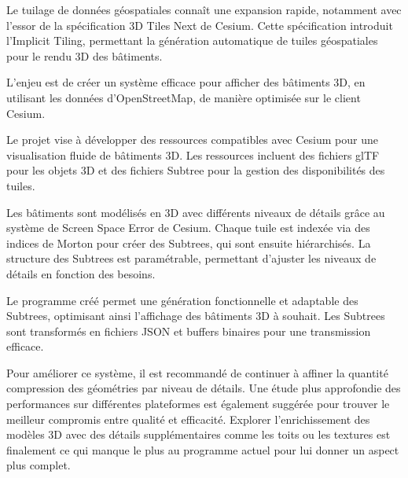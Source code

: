 Le tuilage de données géospatiales connaît une expansion rapide, notamment avec l'essor de la spécification 3D Tiles Next de Cesium. Cette spécification introduit l'Implicit Tiling, permettant la génération automatique de tuiles géospatiales pour le rendu 3D des bâtiments.

L'enjeu est de créer un système efficace pour afficher des bâtiments 3D, en utilisant les données d'OpenStreetMap, de manière optimisée sur le client Cesium.

Le projet vise à développer des ressources compatibles avec Cesium pour une visualisation fluide de bâtiments 3D. Les ressources incluent des fichiers glTF pour les objets 3D et des fichiers Subtree pour la gestion des disponibilités des tuiles.

Les bâtiments sont modélisés en 3D avec différents niveaux de détails grâce au système de Screen Space Error de Cesium. Chaque tuile est indexée via des indices de Morton pour créer des Subtrees, qui sont ensuite hiérarchisés. La structure des Subtrees est paramétrable, permettant d'ajuster les niveaux de détails en fonction des besoins.

Le programme créé permet une génération fonctionnelle et adaptable des Subtrees, optimisant ainsi l'affichage des bâtiments 3D à souhait. Les Subtrees sont transformés en fichiers JSON et buffers binaires pour une transmission efficace.

Pour améliorer ce système, il est recommandé de continuer à affiner la quantité compression des géométries par niveau de détails. Une étude plus approfondie des performances sur différentes plateformes est également suggérée pour trouver le meilleur compromis entre qualité et efficacité. Explorer l'enrichissement des modèles 3D avec des détails supplémentaires comme les toits ou les textures est finalement ce qui manque le plus au programme actuel pour lui donner un aspect plus complet.

